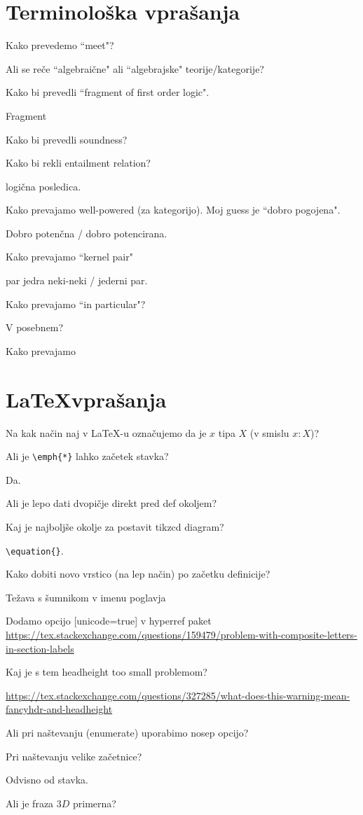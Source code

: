 \documentclass[12pt,a4paper]{article}
\newcommand\ans{\item[\textbf{A:}]}
\begin{document}
    \section*{Terminološka vprašanja}
    \begin{vprasanja}
        \item Kako prevedemo ``meet"?
        \ans
        \item Ali se reče ``algebraične" ali ``algebrajske" teorije/kategorije?
        \ans
        \item Kako bi prevedli ``fragment of first order logic".
        \ans Fragment
        \item Kako bi prevedli soundness?
        \ans
        \item Kako bi rekli entailment relation?
        \ans logična posledica.
        \item Kako prevajamo well-powered (za kategorijo). Moj guess je ``dobro pogojena".
        \ans Dobro potenčna / dobro potencirana.
        \item Kako prevajamo ``kernel pair"
        \ans par jedra neki-neki / jederni par.
        \item Kako prevajamo ``in particular"?
        \ans V posebnem?
        \item Kako prevajamo 
    \end{vprasanja}

    \section*{\LaTeX vprašanja}
    \begin{vprasanja}
        \item Na kak način naj v \LaTeX -u označujemo da je $x$ tipa $X$ (v smislu $x:X$)?
        \ans
        \item Ali je \verb|\emph{*}| lahko začetek stavka?
        \ans Da.
        \item Ali je lepo dati dvopičje direkt pred def okoljem?
        \ans
        \item Kaj je najboljše okolje za postavit tikzcd diagram?
        \ans \verb|\equation{}|.
        \item Kako dobiti novo vrstico (na lep način) po začetku definicije?
        \ans 
        \item Težava s šumnikom v imenu poglavja
        \ans Dodamo opcijo [unicode=true] v hyperref paket
        \url{https://tex.stackexchange.com/questions/159479/problem-with-composite-letters-in-section-labels}
        \item Kaj je s tem headheight too small problemom?
        \ans \url{https://tex.stackexchange.com/questions/327285/what-does-this-warning-mean-fancyhdr-and-headheight}
        \item Ali pri naštevanju (enumerate) uporabimo nosep opcijo?
        \ans
        \item Pri naštevanju velike začetnice?
        \ans Odvisno od stavka.
        \item Ali je fraza $3D$ primerna?
    \end{vprasanja}
\end{document}
